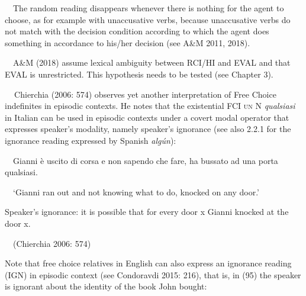 \begin{styleStandard}
\ \ The random reading disappears whenever there is nothing for the agent to choose, as for example with unaccusative verbs, because unaccusative verbs do not match with the decision condition according to which the agent does something in accordance to his/her decision (see A\&M 2011, 2018).
\end{styleStandard}

\begin{styleStandard}
\ \ A\&M (2018) assume lexical ambiguity between RCI/HI and EVAL and that EVAL is unrestricted. This hypothesis needs to be tested (see Chapter 3).
\end{styleStandard}

\begin{styleStandard}
\textbf{\ \ }Chierchia (2006: 574) observes yet another interpretation of Free Choice indefinites in episodic contexts. He notes that the existential FCI \textsc{un} N \textit{qualsiasi} in Italian can be used in episodic contexts under a covert modal operator that expresses speaker’s modality, namely speaker’s ignorance (see also 2.2.1 for the ignorance reading expressed by Spanish \textit{algún}):
\end{styleStandard}

\begin{styleStandard}
\label{bkm:Ref533762757}\ \ Gianni è uscito di corsa e non sapendo che fare, ha bussato ad una porta qualsiasi.
\end{styleStandard}

\begin{styleStandard}
\ \ ‘Gianni ran out and not knowing what to do, knocked on any door.’
\end{styleStandard}

\begin{styleStandard}
Speaker’s ignorance: it is possible that for every door x Gianni knocked at the door x.
\end{styleStandard}

\begin{styleStandard}
\ \ (Chierchia 2006: 574)
\end{styleStandard}

\begin{styleStandard}
Note that free choice relatives in English can also express an ignorance reading (IGN) in episodic context (see Condoravdi 2015: 216), that is, in (95) the speaker is ignorant about the identity of the book John bought:
\end{styleStandard}

